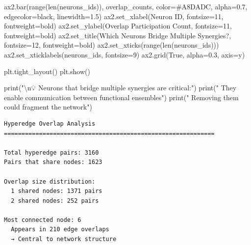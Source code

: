 \documentclass[
  11pt,
  letterpaper,
  oneside,
  openany]{book}
\newenvironment{Shaded}{\begin{snugshade}}{\end{snugshade}}
\newcommand{\BuiltInTok}[1]{\textcolor[rgb]{0.00,0.23,0.31}{#1}}
\newcommand{\CharTok}[1]{\textcolor[rgb]{0.13,0.47,0.30}{#1}}
\newcommand{\DecValTok}[1]{\textcolor[rgb]{0.68,0.00,0.00}{#1}}
\newcommand{\FloatTok}[1]{\textcolor[rgb]{0.68,0.00,0.00}{#1}}
\newcommand{\NormalTok}[1]{\textcolor[rgb]{0.00,0.23,0.31}{#1}}
\newcommand{\OperatorTok}[1]{\textcolor[rgb]{0.37,0.37,0.37}{#1}}
\newcommand{\StringTok}[1]{\textcolor[rgb]{0.13,0.47,0.30}{#1}}
\newcommand{\VariableTok}[1]{\textcolor[rgb]{0.07,0.07,0.07}{#1}}
\begin{document}
\begin{Shaded}
\begin{Highlighting}[]
\NormalTok{        ax2.bar(}\BuiltInTok{range}\NormalTok{(}\BuiltInTok{len}\NormalTok{(neurons\_ids)), overlap\_counts, color}\OperatorTok{=}\StringTok{\textquotesingle{}\#A8DADC\textquotesingle{}}\NormalTok{,}
\NormalTok{               alpha}\OperatorTok{=}\FloatTok{0.7}\NormalTok{, edgecolor}\OperatorTok{=}\StringTok{\textquotesingle{}black\textquotesingle{}}\NormalTok{, linewidth}\OperatorTok{=}\FloatTok{1.5}\NormalTok{)}
\NormalTok{        ax2.set\_xlabel(}\StringTok{\textquotesingle{}Neuron ID\textquotesingle{}}\NormalTok{, fontsize}\OperatorTok{=}\DecValTok{11}\NormalTok{, fontweight}\OperatorTok{=}\StringTok{\textquotesingle{}bold\textquotesingle{}}\NormalTok{)}
\NormalTok{        ax2.set\_ylabel(}\StringTok{\textquotesingle{}Overlap Participation Count\textquotesingle{}}\NormalTok{, fontsize}\OperatorTok{=}\DecValTok{11}\NormalTok{, fontweight}\OperatorTok{=}\StringTok{\textquotesingle{}bold\textquotesingle{}}\NormalTok{)}
\NormalTok{        ax2.set\_title(}\StringTok{\textquotesingle{}Which Neurons Bridge Multiple Synergies?\textquotesingle{}}\NormalTok{, }
\NormalTok{                     fontsize}\OperatorTok{=}\DecValTok{12}\NormalTok{, fontweight}\OperatorTok{=}\StringTok{\textquotesingle{}bold\textquotesingle{}}\NormalTok{)}
\NormalTok{        ax2.set\_xticks(}\BuiltInTok{range}\NormalTok{(}\BuiltInTok{len}\NormalTok{(neurons\_ids)))}
\NormalTok{        ax2.set\_xticklabels(neurons\_ids, fontsize}\OperatorTok{=}\DecValTok{9}\NormalTok{)}
\NormalTok{        ax2.grid(}\VariableTok{True}\NormalTok{, alpha}\OperatorTok{=}\FloatTok{0.3}\NormalTok{, axis}\OperatorTok{=}\StringTok{\textquotesingle{}y\textquotesingle{}}\NormalTok{)}
    
\NormalTok{    plt.tight\_layout()}
\NormalTok{    plt.show()}
    
    \BuiltInTok{print}\NormalTok{(}\StringTok{"}\CharTok{\textbackslash{}n}\StringTok{💡 Neurons that bridge multiple synergies are critical:"}\NormalTok{)}
    \BuiltInTok{print}\NormalTok{(}\StringTok{"   They enable communication between functional ensembles"}\NormalTok{)}
    \BuiltInTok{print}\NormalTok{(}\StringTok{"   Removing them could fragment the network"}\NormalTok{)}
\end{Highlighting}
\end{Shaded}

\begin{verbatim}
Hyperedge Overlap Analysis
============================================================

Total hyperedge pairs: 3160
Pairs that share nodes: 1623

Overlap size distribution:
  1 shared nodes: 1371 pairs
  2 shared nodes: 252 pairs

Most connected node: 6
  Appears in 210 edge overlaps
  → Central to network structure
\end{verbatim}
\end{document}
